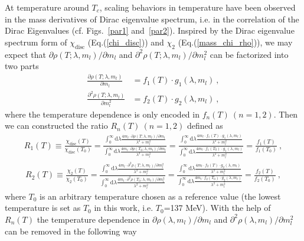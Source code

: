 \documentclass[a4paper,11pt]{article}
\numberwithin{equation}{section}
\begin{document}
At temperature around $T_c$, scaling behaviors in temperature have been observed in the mass derivatives of Dirac eigenvalue spectrum, i.e. in the correlation of the Dirac Eigenvalues (cf. Figs.~\ref{par1} and~\ref{par2}). Inspired by the Dirac eigenvalue spectrum form of $\chi_{\mathrm{disc}}$ (Eq.(\ref{chi_disc})) and $\chi_2$ (Eq.(\ref{mass_chi_rho})), we may expect that $\partial \rho(T;\lambda, m_l)/\partial m_l$ and $\partial^2 \rho(T;\lambda, m_l)/ \partial m_l^2$ can be factorized into two parts
\begin{align}
\label{par1_factorize}
\frac{\partial \rho(T;\lambda, m_l)}{\partial m_l}&= f_1(T)\cdot g_1(\lambda,m_l)~,
\\
\label{par2_factorize}
\frac{\partial^2 \rho(T;\lambda, m_l)}{\partial m_l^2}&= f_2(T)\cdot g_2(\lambda,m_l)~,
\end{align}
where the temperature dependence is only encoded in $f_n(T)~(n=1,2)$. Then we can constructed the ratio $R_n(T)~(n=1,2)$ defined as
\begin{align}
R_1(T)
\equiv \frac{\chi_{\mathrm{disc}}(T)}{\chi_{\mathrm{disc}}(T_0)}
=\frac{ \int_{0}^{\infty} \mathrm{d} \lambda \frac{4 m_{l}  \cdot { \partial \rho(T;\lambda, m_l) / \partial m_{l}}}{\lambda^{2}+m_{l}^{2}} }{ \int_{0}^{\infty} \mathrm{d} \lambda \frac{4 m_{l}  \cdot { \partial \rho(T_0;\lambda, m_l) / \partial m_{l}}}{\lambda^{2}+m_{l}^{2}} }
=\frac{ \int_{0}^{\infty} \mathrm{d} \lambda \frac{4 m_{l}  \cdot  { f_1(T)\cdot g_1(\lambda,m_l)} }{\lambda^{2}+m_{l}^{2}} }{ \int_{0}^{\infty} \mathrm{d} \lambda \frac{4 m_{l}  \cdot  { f_1(T_0)\cdot g_1(\lambda,m_l)} }{\lambda^{2}+m_{l}^{2}} }
=\frac{f_1(T)}{f_1(T_0)}
~,
\end{align}
\begin{align}
R_2(T) 
\equiv \frac{\chi_2(T)}{\chi_2(T_0)}
=\frac{ \int_{0}^{\infty} \mathrm{d} \lambda \frac{4 m_{l} \cdot { \partial^2 \rho(T;\lambda, m_l) / \partial m_{l}^2}}{\lambda^{2}+m_{l}^{2}}}{\int_{0}^{\infty} \mathrm{d} \lambda \frac{4 m_{l} \cdot { \partial^2 \rho (T_0;\lambda, m_l)/ \partial m_{l}^2}}{\lambda^{2}+m_{l}^{2}}}
=\frac{\int_{0}^{\infty} \mathrm{d} \lambda \frac{4 m_{l}  \cdot { f_2(T)\cdot g_2(\lambda,m_l) }}{\lambda^{2}+m_{l}^{2}}}{\int_{0}^{\infty} \mathrm{d} \lambda \frac{4 m_{l}  \cdot { f_2(T_0)\cdot g_2(\lambda,m_l) }}{\lambda^{2}+m_{l}^{2}}}
=\frac{f_2(T)}{f_2(T_0)} ~,
\end{align}
where $T_0$ is an arbitrary temperature chosen as a reference value (the lowest temperature is set as $T_0$ in this work, i.e. $T_0$=137 MeV). With the help of $R_n(T)$ the temperature dependence in $\partial \rho(\lambda, m_l)/\partial m_l$ and $\partial^2 \rho(\lambda, m_l)/ \partial m_l^2$ can be removed in the following way
\end{document}
